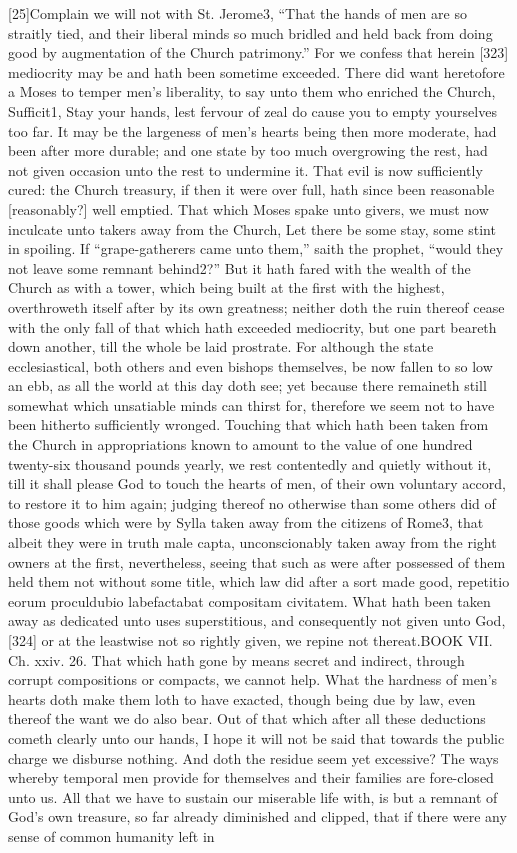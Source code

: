 [25]Complain we will not with St. Jerome3, “That the hands of men are so straitly tied, and their liberal minds so much bridled and held back from doing good by augmentation of the Church patrimony.” For we confess that herein [323] mediocrity may be and hath been sometime exceeded. There did want heretofore a Moses to temper men’s liberality, to say unto them who enriched the Church, Sufficit1, Stay your hands, lest fervour of zeal do cause you to empty yourselves too far. It may be the largeness of men’s hearts being then more moderate, had been after more durable; and one state by too much overgrowing the rest, had not given occasion unto the rest to undermine it. That evil is now sufficiently cured: the Church treasury, if then it were over full, hath since been reasonable [reasonably?] well emptied. That which Moses spake unto givers, we must now inculcate unto takers away from the Church, Let there be some stay, some stint in spoiling. If “grape-gatherers came unto them,” saith the prophet, “would they not leave some remnant behind2?” But it hath fared with the wealth of the Church as with a tower, which being built at the first with the highest, overthroweth itself after by its own greatness; neither doth the ruin thereof cease with the only fall of that which hath exceeded mediocrity, but one part beareth down another, till the whole be laid prostrate. For although the state ecclesiastical, both others and even bishops themselves, be now fallen to so low an ebb, as all the world at this day doth see; yet because there remaineth still somewhat which unsatiable minds can thirst for, therefore we seem not to have been hitherto sufficiently wronged. Touching that which hath been taken from the Church in appropriations known to amount to the value of one hundred twenty-six thousand pounds yearly, we rest contentedly and quietly without it, till it shall please God to touch the hearts of men, of their own voluntary accord, to restore it to him again; judging thereof no otherwise than some others did of those goods which were by Sylla taken away from the citizens of Rome3, that albeit they were in truth male capta, unconscionably taken away from the right owners at the first, nevertheless, seeing that such as were after possessed of them held them not without some title, which law did after a sort made good, repetitio eorum proculdubio labefactabat compositam civitatem. What hath been taken away as dedicated unto uses superstitious, and consequently not given unto God, [324] or at the leastwise not so rightly given, we repine not thereat.BOOK VII. Ch. xxiv. 26. That which hath gone by means secret and indirect, through corrupt compositions or compacts, we cannot help. What the hardness of men’s hearts doth make them loth to have exacted, though being due by law, even thereof the want we do also bear. Out of that which after all these deductions cometh clearly unto our hands, I hope it will not be said that towards the public charge we disburse nothing. And doth the residue seem yet excessive? The ways whereby temporal men provide for themselves and their families are fore-closed unto us. All that we have to sustain our miserable life with, is but a remnant of God’s own treasure, so far already diminished and clipped, that if there were any sense of common humanity left in 